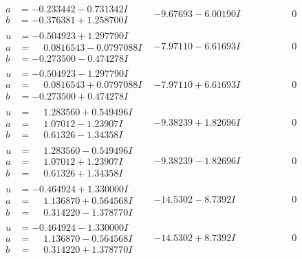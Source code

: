 \documentclass[1p]{elsarticle_modified}
\theoremstyle{definition}
\begin{document}
$$\begin{array}{c|c|c}
\begin{aligned}
a &= -0.233442 - 0.731342 I \\
b &= -0.376381 + 1.258700 I\end{aligned}
 & -9.67693 - 6.00190 I & \phantom{-0.000000 } 0 \\ \hline\begin{aligned}
u &= -0.504923 + 1.297790 I \\
a &= \phantom{-}0.0816543 - 0.0797088 I \\
b &= -0.273500 - 0.474278 I\end{aligned}
 & -7.97110 - 6.61693 I & \phantom{-0.000000 } 0 \\ \hline\begin{aligned}
u &= -0.504923 - 1.297790 I \\
a &= \phantom{-}0.0816543 + 0.0797088 I \\
b &= -0.273500 + 0.474278 I\end{aligned}
 & -7.97110 + 6.61693 I & \phantom{-0.000000 } 0 \\ \hline\begin{aligned}
u &= \phantom{-}1.283560 + 0.549496 I \\
a &= \phantom{-}1.07012 - 1.23907 I \\
b &= \phantom{-}0.61326 - 1.34358 I\end{aligned}
 & -9.38239 + 1.82696 I & \phantom{-0.000000 } 0 \\ \hline\begin{aligned}
u &= \phantom{-}1.283560 - 0.549496 I \\
a &= \phantom{-}1.07012 + 1.23907 I \\
b &= \phantom{-}0.61326 + 1.34358 I\end{aligned}
 & -9.38239 - 1.82696 I & \phantom{-0.000000 } 0 \\ \hline\begin{aligned}
u &= -0.464924 + 1.330000 I \\
a &= \phantom{-}1.136870 + 0.564568 I \\
b &= \phantom{-}0.314220 - 1.378770 I\end{aligned}
 & -14.5302 - 8.7392 I & \phantom{-0.000000 } 0 \\ \hline\begin{aligned}
u &= -0.464924 - 1.330000 I \\
a &= \phantom{-}1.136870 - 0.564568 I \\
b &= \phantom{-}0.314220 + 1.378770 I\end{aligned}
 & -14.5302 + 8.7392 I & \phantom{-0.000000 } 0 \\ \hline\begin{aligned}

\end{aligned}
\end{array}$$
\end{document}
